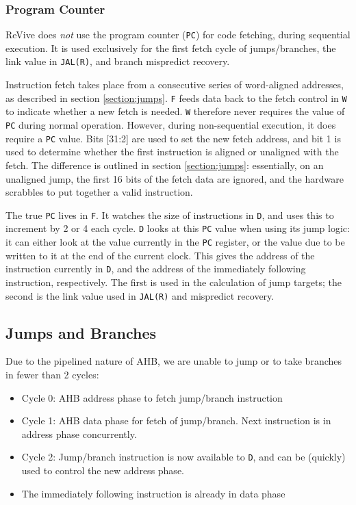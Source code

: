 \documentclass{article}
\begin{document}
\subsubsection{Program Counter}

ReVive does \textit{not} use the program counter (\texttt{PC}) for code fetching, during sequential execution. It is used exclusively for the first fetch cycle of jumps/branches, the link value in \texttt{JAL(R)}, and branch mispredict recovery.

Instruction fetch takes place from a consecutive series of word-aligned addresses, as described in section \ref{section:jumps}. \texttt{F} feeds data back to the fetch control in \texttt{W} to indicate whether a new fetch is needed. \texttt{W} therefore never requires the value of \texttt{PC} during normal operation. However, during non-sequential execution, it does require a \texttt{PC} value. Bits [31:2] are used to set the new fetch address, and bit 1 is used to determine whether the first instruction is aligned or unaligned with the fetch. The difference is outlined in section \ref{section:jumps}: essentially, on an unaligned jump, the first 16 bits of the fetch data are ignored, and the hardware scrabbles to put together a valid instruction.

The true \texttt{PC} lives in \texttt{F}. It watches the size of instructions in \texttt{D}, and uses this to increment by 2 or 4 each cycle. \texttt{D} looks at this \texttt{PC} value when using its jump logic: it can either look at the value currently in the \texttt{PC} register, or the value due to be written to it at the end of the current clock. This gives the address of the instruction currently in \texttt{D}, and the address of the immediately following instruction, respectively. The first is used in the calculation of jump targets; the second is the link value used in \texttt{JAL(R)} and mispredict recovery.

\subsection{Jumps and Branches}

Due to the pipelined nature of AHB, we are unable to jump or to take branches in fewer than 2 cycles:

\begin{itemize}
\item Cycle 0: AHB address phase to fetch jump/branch instruction
\item Cycle 1: AHB data phase for fetch of jump/branch. Next instruction is in address phase concurrently.
\item Cycle 2: Jump/branch instruction is now available to \texttt{D}, and can be (quickly) used to control the new address phase.
\item The immediately following instruction is already in data phase
\end{itemize}
\end{document}
